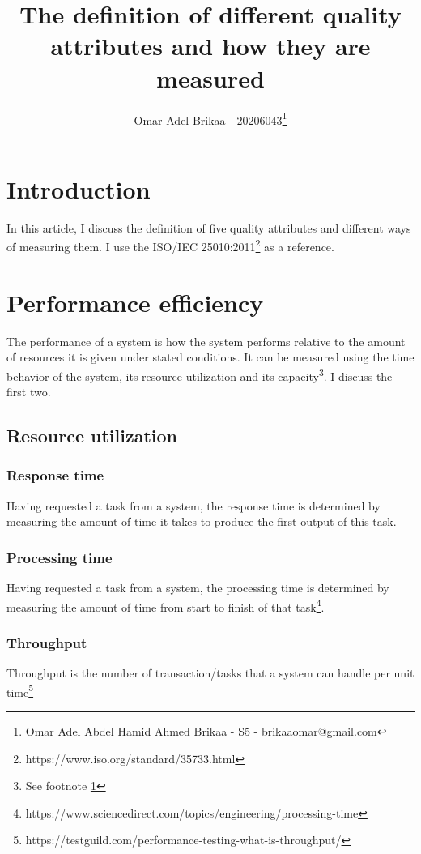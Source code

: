 \documentclass[11pt,a4paper]{article}
\begin{document}
\title{The definition of different quality attributes and how they are measured}
\author{Omar Adel Brikaa - 20206043\thanks{Omar Adel Abdel Hamid Ahmed Brikaa - S5 - brikaaomar@gmail.com}}
\date{}
\maketitle

\tableofcontents

\section{Introduction}
In this article, I discuss the definition of five quality attributes and different ways of measuring them. I use the
ISO/IEC 25010:2011\footnote{\label{iso}https://www.iso.org/standard/35733.html} as a reference.

\section{Performance efficiency}
The performance of a system is how the system performs relative to the amount of resources it is given
under stated conditions. It can be measured using the time behavior of the system, its resource utilization and its
capacity\footnote{See footnote \ref{iso}}. I discuss the first two.

\subsection{Resource utilization}

\subsubsection{Response time}
Having requested a task from a system, the response time is determined by measuring
the amount of time it takes to produce the first output of this task.

\subsubsection{Processing time}
Having requested a task from a system, the processing time is determined by measuring
the amount of time from start to finish of that
task\footnote{https://www.sciencedirect.com/topics/engineering/processing-time}.

\subsubsection{Throughput}
Throughput is the number of transaction/tasks that a system can handle per unit
time\footnote{https://testguild.com/performance-testing-what-is-throughput/}
\end{document}

